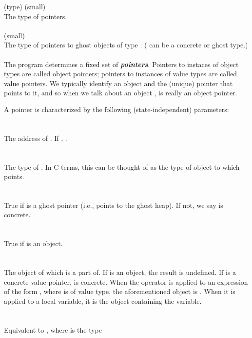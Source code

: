 \documentclass[preprint,nocopyrightspace]{sigplanconf}
\newcommand{\Def}[1]{\textit{\textbf{#1}}}
\begin{document}
{{\vcc{\object} (type) (small)\\
The type of pointers.
\\\\
 (small)\\
The type of pointers to ghost objects of type . ( can be a concrete or ghost type.)
\\\\
The program determines a fixed set of \Def{pointers}.  Pointers to
instaces of object types are called object pointers; pointers to instances of
value types are called value pointers. We typically identify an object
and the (unique) pointer that points to it, and so when we talk about
an object ,  is really an object pointer.

A pointer is characterized by the following (state-independent) parameters:
\\\\
\\
The address of . If , 
.
\\\\
\\
The type of . In C terms, this can be thought of as the type of
object to which  points.
\\\\
\\
True if  is a ghost pointer (i.e., points to the ghost
heap). If not, we say  is concrete. 
\\\\
\\
True if  is an object. 
\\\\
\\
The object of which  is a part of. If  is an object, the
result is undefined. If  is a concrete value pointer,
 is concrete.
When the \vcc{&} operator is applied to an expression of the
form , where  is of value type, the
aforementioned object is . When it is applied to a local
variable, it is the object containing the variable.
\\\\
\\
Equivalent to , where  is the type
}}
\end{document}
